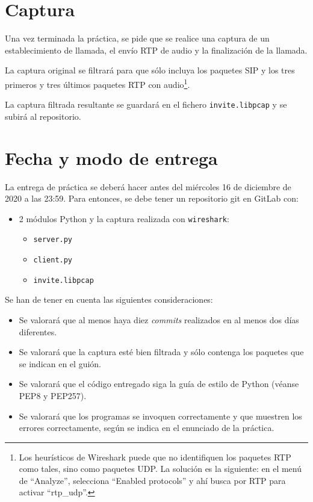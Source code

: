 \documentclass[a4paper,11pt]{article}
\begin{document}
\section*{Captura}

Una vez terminada la práctica, se pide que se realice una captura de un
establecimiento de llamada, el envío RTP de audio y la finalización de
la llamada. 

La captura original se filtrará para que sólo incluya los paquetes
SIP y los tres primeros y tres últimos paquetes RTP con audio\footnote{Los heurísticos de Wireshark puede que no identifiquen los paquetes RTP como tales, sino como paquetes UDP. La solución es la siguiente: en el menú de ``Analyze'', selecciona ``Enabled protocols'' y ahí busca por RTP para activar ``rtp\_udp''.}.

La captura filtrada resultante se guardará en el fichero \texttt{invite.libpcap}
y se subirá al repositorio.


\section*{Fecha y modo de entrega}

La entrega de práctica se deberá hacer antes del miércoles 16 de diciembre de 2020 a las 23:59. Para entonces, se debe tener un repositorio git en GitLab con: 

    \begin{itemize}
        \item 2 módulos Python y la captura realizada con \texttt{wireshark}:
    \begin{itemize}
      \item \texttt{server.py}
      \item \texttt{client.py}
      \item \texttt{invite.libpcap}
    \end{itemize}
\end{itemize}

Se han de tener en cuenta las siguientes consideraciones:
\begin{itemize}
  \item Se valorará que al menos haya diez \emph{commits} realizados en al menos dos días diferentes.
  \item Se valorará que la captura esté bien filtrada y sólo contenga los paquetes que se indican en el guión.
  \item Se valorará que el código entregado siga la guía de estilo de Python (véanse PEP8 y PEP257).
  \item Se valorará que los programas se invoquen correctamente y que muestren los errores correctamente, según se indica en el enunciado de la práctica.
\end{itemize}
\end{document}
